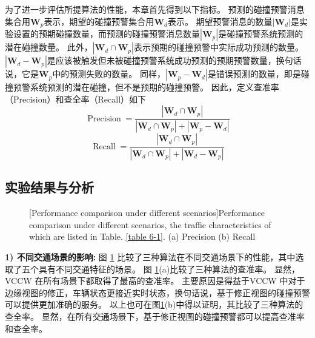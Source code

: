 为了进一步评估所提算法的性能，本章首先得到以下指标。
预测的碰撞预警消息集合用$\mathbf{W}_{p}$表示，期望的碰撞预警集合用$\mathbf{W}_{d}$表示。
期望预警消息的数量$\left| \mathbf{W}_{d} \right|$是实验设置的预期碰撞数量，而预测的碰撞预警消息数量$\left| \mathbf{W}_{p} \right|$是碰撞预警系统预测的潜在碰撞数量。
此外，$\left| \mathbf{W}_{d} \cap \mathbf{W}_{p} \right|$表示预期的碰撞预警中实际成功预测的数量。
$\left| \mathbf{W}_{d} - \mathbf{W}_{p} \right|$是应该被触发但未被碰撞预警系统成功预测的预期预警数量，换句话说，它是$\mathbf{W}_{p}$中的预测失败的数量。
同样，$\left| {\mathbf{W}_{p} - \mathbf{W}_{d}} \right|$是错误预测的数量，即是碰撞预警系统预测的潜在碰撞，但不是预期的碰撞预警。
因此，定义查准率（Precision）和查全率（Recall）如下
\begin{equation}
	\operatorname{Precision} = \frac{{\left| {\mathbf{W}_{d} \cap \mathbf{W}_{p}} \right|}}{{\left| {\mathbf{W}_{d} \cap \mathbf{W}_{p}} \right| + \left| {\mathbf{W}_{p} - \mathbf{W}_{d}} \right|}}
\end{equation}
\begin{equation}
	\operatorname{Recall} = \frac{{\left| {\mathbf{W}_{d} \cap \mathbf{W}_{p}} \right|}}{{\left| {\mathbf{W}_{d} \cap \mathbf{W}_{p}} \right| + \left| {\mathbf{W}_{d} - \mathbf{W}_{p}} \right|}}
\end{equation}

\subsection{实验结果与分析}

\begin{figure}[h]
     \centering
     [Performance comparison under different scenarios]{Performance comparison under different scenarios, the traffic characteristics of which are listed in Table. \ref{table 6-1}. (a) Precision (b) Recall}
     \label{fig 6-5}
\end{figure}

\textbf{1) 不同交通场景的影响:}
图 \ref{fig 6-5} 比较了三种算法在不同交通场景下的性能，其中选取了五个具有不同交通特征的场景。
图 \ref{fig 6-5}(a)比较了三种算法的查准率。
显然，VCCW 在所有场景下都取得了最高的查准率。
主要原因是得益于VCCW 中对于边缘视图的修正，车辆状态更接近实时状态，换句话说，基于修正视图的碰撞预警可以提供更加准确的服务。
以上也可在图\ref{fig 6-5}(b)中得以证明，其比较了三种算法的查全率。
显然，在所有交通场景下，基于修正视图的碰撞预警都可以提高查准率和查全率。

